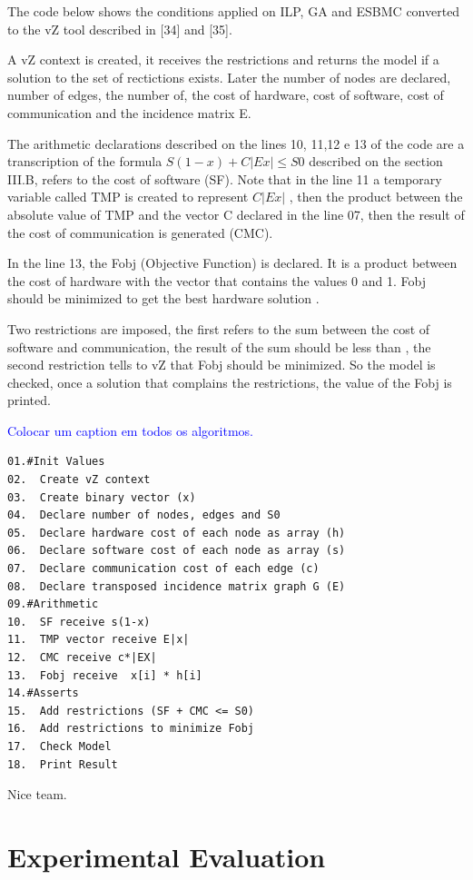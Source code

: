 The code below shows the conditions applied on ILP, GA and ESBMC converted to the vZ tool described in [34] and [35]. 

A vZ context is created, it receives the restrictions and returns the model if a solution to the set of rectictions exists. Later the number of nodes are declared, number of edges, the number of, the cost of hardware, cost of software, cost of communication and the incidence matrix E.

The arithmetic declarations described on the lines 10, 11,12 e 13 of the code are a transcription of the formula $ S(1-x) + C|Ex| \leq S{0} $ described on the section III.B, refers to the cost of software (SF). Note that in the line 11 a temporary variable called TMP is created to represent $C|Ex|$  , then the product between the absolute value of TMP and the vector C declared in the line 07, then the result of the cost of communication is generated (CMC). 

In the line 13, the Fobj (Objective Function) is declared. It is a product between the cost of hardware with the vector that contains the values 0 and 1. Fobj should be minimized to get the best hardware solution .

Two restrictions are imposed, the first refers to the sum between the cost of software and communication, the result of the sum should be less than , the second restriction tells to vZ that Fobj should be minimized. So the model is checked, once a solution that complains the restrictions, the value of the Fobj is printed.

\textcolor{blue}{Colocar um caption em todos os algoritmos.}

\begin{lstlisting}[caption=Pseudocode describing vZ]
01.#Init Values
02.  Create vZ context 
03.  Create binary vector (x)
04.  Declare number of nodes, edges and S0
05.  Declare hardware cost of each node as array (h) 
06.  Declare software cost of each node as array (s)
07.  Declare communication cost of each edge (c)
08.  Declare transposed incidence matrix graph G (E)
09.#Arithmetic
10.  SF receive s(1-x)
11.  TMP vector receive E|x| 
12.  CMC receive c*|EX|
13.  Fobj receive  x[i] * h[i]
14.#Asserts
15.  Add restrictions (SF + CMC <= S0)
16.  Add restrictions to minimize Fobj
17.  Check Model
18.  Print Result
\end{lstlisting}

Nice team.

\section{Experimental Evaluation}

